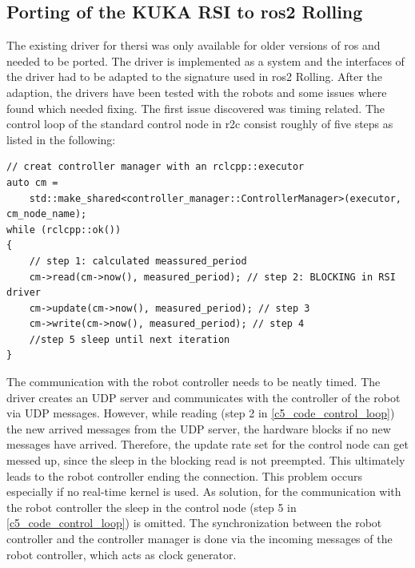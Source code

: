 \subsection{Porting of the KUKA RSI to \gls{ros2} Rolling}
The existing driver for the\gls{rsi} was only available for older versions of \gls{ros} and needed to be ported. 
The driver is implemented as a system and the interfaces of the driver had to be adapted to the signature used in \gls{ros2} Rolling. After the adaption, the drivers have been tested with the robots and some issues where found which needed fixing.\newline 
The first issue discovered was timing related. The control loop of the standard control node in \gls{r2c} consist roughly of five steps as listed in the following:\newline
\lstset{language=C++,basicstyle=\scriptsize}
\begin{lstlisting}[caption=Pseudo code for the control loop.,label=c5_code_control_loop]
// creat controller manager with an rclcpp::executor
auto cm = 
    std::make_shared<controller_manager::ControllerManager>(executor, cm_node_name);
while (rclcpp::ok())
{   
    // step 1: calculated meassured_period
    cm->read(cm->now(), measured_period); // step 2: BLOCKING in RSI driver
    cm->update(cm->now(), measured_period); // step 3
    cm->write(cm->now(), measured_period); // step 4
    //step 5 sleep until next iteration
}
\end{lstlisting}
The communication with the robot controller needs to be neatly timed. The driver creates an UDP server and communicates with the controller of the robot via UDP messages. However, while reading (step 2 in \autoref{c5_code_control_loop}) the new arrived messages from the UDP server, the hardware blocks if no new messages have arrived. Therefore, the update rate set for the control node can get messed up, since the sleep in the blocking read is not preempted. This ultimately leads to the robot controller ending the connection. This problem occurs especially if no real-time kernel is used.\newline
As solution, for the communication with the robot controller the sleep in the control node (step 5 in \autoref{c5_code_control_loop}) is omitted. The synchronization between the robot controller and the controller manager is done via the incoming messages of the robot controller, which acts as clock generator.

